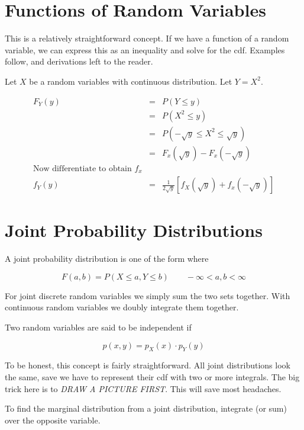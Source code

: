\section{Functions of Random Variables}
This is a relatively straightforward concept. If we have a function of a random variable, we can express this as an
inequality and solve for the cdf. Examples follow, and derivations left to the reader.\newline

Let $X$ be a random variables with continuous distribution. Let $Y = X^2$.

\[
    \begin{aligned}
        F_Y(y) &=& P\left( Y \le y \right)\\
               &=& P\left( X^2 \le y \right)\\
               &=& P\left( -\sqrt{y} \le X^2 \le \sqrt{y} \right)\\
               &=& F_x(\sqrt{y}) - F_x(-\sqrt{y})\\
        \text{Now differentiate to obtain $f_x$}\\
        f_Y(y) &=& \frac{1}{2\sqrt{y} } \left[ f_X(\sqrt{y}) + f_x(-\sqrt{y}) \right]
    \end{aligned}
\]

\section{Joint Probability Distributions}
A joint probability distribution is one of the form where

\[
    F(a, b) = P\left( X \le a, Y \le b \right) \qquad -\infty < a, b < \infty
\]

For joint discrete random variables we simply sum the two sets together. With continuous random variables we doubly
integrate them together.\newline

Two random variables are said to be independent if

\[
    p(x, y) = p_X(x) \cdot p_Y(y)
\]

To be honest, this concept is fairly straightforward. All joint distributions look the same, save we have to represent
their cdf with two or more integrals. The big trick here is to \textit{DRAW A PICTURE FIRST}. This will save most
headaches.\newline

To find the marginal distribution from a joint distribution, integrate (or sum) over the opposite variable.

